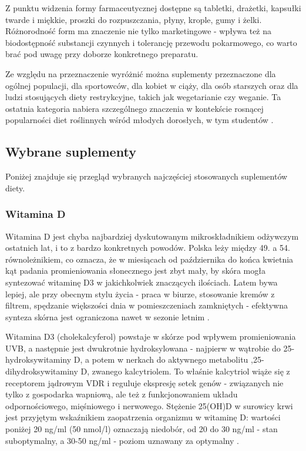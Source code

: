 Z punktu widzenia formy farmaceutycznej dostępne są tabletki, drażetki, kapsułki twarde i miękkie, proszki do rozpuszczania, płyny, krople, gumy i żelki. Różnorodność form ma znaczenie nie tylko marketingowe - wpływa też na biodostępność substancji czynnych i tolerancję przewodu pokarmowego, co warto brać pod uwagę przy doborze konkretnego preparatu.

Ze względu na przeznaczenie wyróżnić można suplementy przeznaczone dla ogólnej populacji, dla sportowców, dla kobiet w ciąży, dla osób starszych oraz dla ludzi stosujących diety restrykcyjne, takich jak wegetarianie czy weganie. Ta ostatnia kategoria nabiera szczególnego znaczenia w kontekście rosnącej popularności diet roślinnych wśród młodych dorosłych, w tym studentów \cite{jarosz2020normy}.

\subsection{Wybrane suplementy}

Poniżej znajduje się przegląd wybranych najczęściej stosowanych suplementów diety.

\subsubsection{Witamina D}

Witamina D jest chyba najbardziej dyskutowanym mikroskładnikiem odżywczym ostatnich lat, i to z bardzo konkretnych powodów. Polska leży między 49. a 54. równoleżnikiem, co oznacza, że w miesiącach od października do końca kwietnia kąt padania promieniowania słonecznego jest zbyt mały, by skóra mogła syntezować witaminę D3 w jakichkolwiek znaczących ilościach. Latem bywa lepiej, ale przy obecnym stylu życia - praca w biurze, stosowanie kremów z filtrem, spędzanie większości dnia w pomieszczeniach zamkniętych - efektywna synteza skórna jest ograniczona nawet w sezonie letnim \cite{pludowski2023guidelines}.

Witamina D3 (cholekalcyferol) powstaje w skórze pod wpływem promieniowania UVB, a następnie jest dwukrotnie hydroksylowana - najpierw w wątrobie do 25-hydroksywitaminy D, a potem w nerkach do aktywnego metabolitu ,25-dihydroksywitaminy D, zwanego kalcytriolem. To właśnie kalcytriol wiąże się z receptorem jądrowym VDR i reguluje ekspresję setek genów - związanych nie tylko z gospodarka wapniową, ale też z funkcjonowaniem układu odpornościowego, mięśniowego i nerwowego. Stężenie 25(OH)D w surowicy krwi jest przyjętym wskaźnikiem zaopatrzenia organizmu w witaminę D: wartości poniżej 20 ng/ml (50 nmol/l) oznaczają niedobór, od 20 do 30 ng/ml - stan suboptymalny, a 30-50 ng/ml - poziom uznawany za optymalny \cite{pludowski2023guidelines}.


